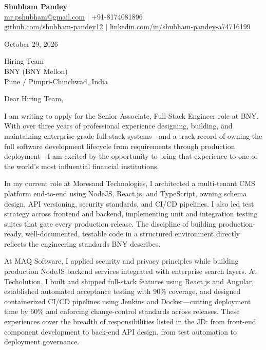 \documentclass[a4paper,11pt]{article}
\begin{document}
\begin{center}
  {\LARGE \textbf{Shubham Pandey}}\\[4pt]
  \href{mailto:mr.pshubham@gmail.com}{mr.pshubham@gmail.com} \quad $|$ \quad +91-8174081896\\
  \href{https://github.com/shubham-pandey12}{github.com/shubham-pandey12} \quad $|$ \quad \href{https://linkedin.com/in/shubham-pandey-a74716199}{linkedin.com/in/shubham-pandey-a74716199}
\end{center}

\vspace{12pt}
October 29, 2026

\vspace{10pt}
Hiring Team\\
BNY (BNY Mellon)\\
Pune / Pimpri-Chinchwad, India

\vspace{14pt}
Dear Hiring Team,

\vspace{8pt}
I am writing to apply for the Senior Associate, Full-Stack Engineer role at BNY. With over three years of professional experience designing, building, and maintaining enterprise-grade full-stack systems---and a track record of owning the full software development lifecycle from requirements through production deployment---I am excited by the opportunity to bring that experience to one of the world's most influential financial institutions.

\vspace{8pt}
In my current role at Moresand Technologies, I architected a multi-tenant CMS platform end-to-end using NodeJS, React.js, and TypeScript, owning schema design, API versioning, security standards, and CI/CD pipelines. I also led test strategy across frontend and backend, implementing unit and integration testing suites that gate every production release. The discipline of building production-ready, well-documented, testable code in a structured environment directly reflects the engineering standards BNY describes.

\vspace{8pt}
At MAQ Software, I applied security and privacy principles while building production NodeJS backend services integrated with enterprise search layers. At Techolution, I built and shipped full-stack features using React.js and Angular, established automated acceptance testing with 90\% coverage, and designed containerized CI/CD pipelines using Jenkins and Docker---cutting deployment time by 60\% and enforcing change-control standards across releases. These experiences cover the breadth of responsibilities listed in the JD: from front-end component development to back-end API design, from test automation to deployment governance.
\end{document}
